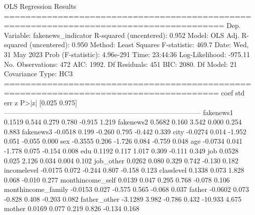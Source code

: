                                 OLS Regression Results                                
=======================================================================================
Dep. Variable:     fakenews_indicator   R-squared (uncentered):                   0.952
Model:                            OLS   Adj. R-squared (uncentered):              0.950
Method:                 Least Squares   F-statistic:                              469.7
Date:                Wed, 31 May 2023   Prob (F-statistic):                   4.96e-291
Time:                        23:44:36   Log-Likelihood:                         -975.11
No. Observations:                 472   AIC:                                      1992.
Df Residuals:                     451   BIC:                                      2080.
Df Model:                          21                                                  
Covariance Type:                  HC3                                                  
======================================================================================
                         coef    std err          z      P>|z|      [0.025      0.975]
--------------------------------------------------------------------------------------
fakenews1              0.1519      0.544      0.279      0.780      -0.915       1.219
fakenews2              0.5682      0.160      3.542      0.000       0.254       0.883
fakenews3             -0.0518      0.199     -0.260      0.795      -0.442       0.339
city                  -0.0274      0.014     -1.952      0.051      -0.055       0.000
sex                   -0.3555      0.206     -1.726      0.084      -0.759       0.048
age                   -0.0734      0.041     -1.778      0.075      -0.154       0.008
edu                    0.1192      0.117      1.017      0.309      -0.111       0.349
job                    0.0528      0.025      2.126      0.034       0.004       0.102
job_other              0.0262      0.080      0.329      0.742      -0.130       0.182
incomelevel           -0.0175      0.072     -0.244      0.807      -0.158       0.123
classlevel             0.1338      0.073      1.828      0.068      -0.010       0.277
monthincome_self       0.0139      0.047      0.295      0.768      -0.078       0.106
monthincome_family    -0.0153      0.027     -0.575      0.565      -0.068       0.037
father                -0.0602      0.073     -0.828      0.408      -0.203       0.082
father_other          -3.1289      3.982     -0.786      0.432     -10.933       4.675
mother                 0.0169      0.077      0.219      0.826      -0.134       0.168
